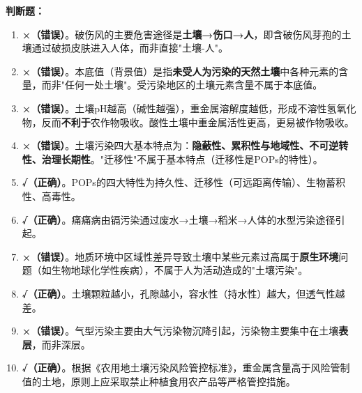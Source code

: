 \textbf{判断题：}
\begin{enumerate}[leftmargin=*, itemsep=5pt]
    \item \textbf{×（错误）}。破伤风的主要危害途径是\textbf{土壤→伤口→人}，即含破伤风芽孢的土壤通过破损皮肤进入人体，而非直接"土壤-人"。
    \item \textbf{×（错误）}。本底值（背景值）是指\textbf{未受人为污染的天然土壤}中各种元素的含量，而非"任何一处土壤"。受污染地区的土壤元素含量不属于本底值。
    \item \textbf{×（错误）}。土壤pH越高（碱性越强），重金属溶解度越低，形成不溶性氢氧化物，反而\textbf{不利于}农作物吸收。酸性土壤中重金属活性更高，更易被作物吸收。
    \item \textbf{×（错误）}。土壤污染四大基本特点为：\textbf{隐蔽性、累积性与地域性、不可逆转性、治理长期性}。"迁移性"不属于基本特点（迁移性是POPs的特性）。
    \item \textbf{√（正确）}。POPs的四大特性为持久性、迁移性（可远距离传输）、生物蓄积性、高毒性。
    \item \textbf{√（正确）}。痛痛病由镉污染通过废水→土壤→稻米→人体的水型污染途径引起。
    \item \textbf{×（错误）}。地质环境中区域性差异导致土壤中某些元素过高属于\textbf{原生环境}问题（如生物地球化学性疾病），不属于人为活动造成的"土壤污染"。
    \item \textbf{√（正确）}。土壤颗粒越小，孔隙越小，容水性（持水性）越大，但透气性越差。
    \item \textbf{×（错误）}。气型污染主要由大气污染物沉降引起，污染物主要集中在土壤\textbf{表层}，而非深层。
    \item \textbf{√（正确）}。根据《农用地土壤污染风险管控标准》，重金属含量高于风险管制值的土地，原则上应采取禁止种植食用农产品等严格管控措施。
\end{enumerate}

\newpage

\newpage